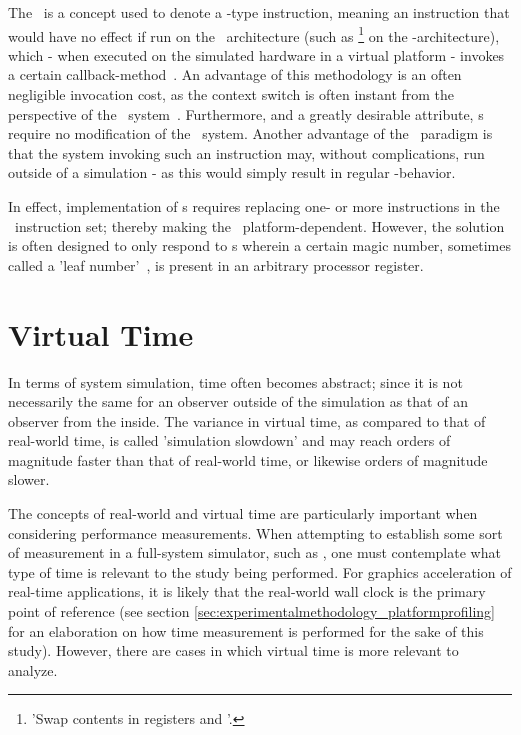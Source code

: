 The \dvttermmagicinstruction\ is a concept used to denote a -type instruction, meaning an instruction that would have no effect if run on the \dvttermtarget\ architecture (such as \footnote{'Swap contents in registers  and '.} on the \dvttermxeightysix -architecture), which - when executed on the simulated hardware in a virtual platform - invokes a certain callback-method~.
An advantage of this methodology is an often negligible invocation cost, as the context switch is often instant from the perspective of the \dvttermtarget\ system~.
Furthermore, and a greatly desirable attribute, \dvttermmagicinstruction s require no modification of the \dvttermtarget\ system.
Another advantage of the \dvttermmagicinstruction\ paradigm is that the system invoking such an instruction may, without complications, run outside of a simulation - as this would simply result in regular -behavior.

In effect, implementation of \dvttermmagicinstruction s requires replacing one- or more instructions in the \dvttermtarget\ instruction set; thereby making the \dvttermmagicinstruction\ platform-dependent.
However, the solution is often designed to only respond to \dvttermmagicinstruction s wherein a certain magic number, sometimes called a 'leaf number'~, is present in an arbitrary processor register.

\section{Virtual Time}
\label{sec:backgroundandrelatedwork_virtualtime}
In terms of system simulation, time often becomes abstract; since it is not necessarily the same for an observer outside of the simulation as that of an observer from the inside.
The variance in virtual time, as compared to that of real-world time, is called 'simulation slowdown' and may reach orders of magnitude faster than that of real-world time, or likewise orders of magnitude slower.

The concepts of real-world and virtual time are particularly important when considering performance measurements.
When attempting to establish some sort of measurement in a full-system simulator, such as \dvttermsimics , one must contemplate what type of time is relevant to the study being performed.
For graphics acceleration of real-time applications, it is likely that the real-world wall clock is the primary point of reference (see section \ref{sec:experimentalmethodology_platformprofiling} for an elaboration on how time measurement is performed for the sake of this study).
However, there are cases in which virtual time is more relevant to analyze.

